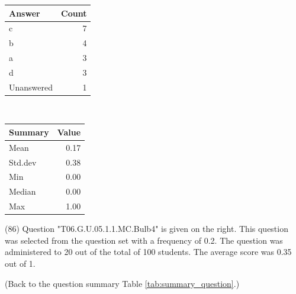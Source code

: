 \documentclass[12pt,nohyper]{tufte-handout}\usepackage[]{graphicx}\usepackage[]{color}
\begin{document}
\begin{center}%
\begin{tabular}{lr}
  \hline
Answer & Count \\ 
  \hline
c &   7 \\ 
  b &   4 \\ 
  a &   3 \\ 
  d &   3 \\ 
  Unanswered &   1 \\ 
   \hline
\end{tabular}
~~~~~~~~%
\begin{tabular}{lr}
  \hline
Summary & Value \\ 
  \hline
Mean & 0.17 \\ 
  Std.dev & 0.38 \\ 
  Min & 0.00 \\ 
  Median & 0.00 \\ 
  Max & 1.00 \\ 
   \hline
\end{tabular}
\end{center}\newpage{} (86) Question "T06.G.U.05.1.1.MC.Bulb4" is given on the right. This question was selected from the question set with a frequency of 0.2. The question was administered to 20 out of the total of 100 students. The average score was 0.35 out of 1.

 (Back to the question summary Table \ref{tab:summary_question}.)
\end{document}
